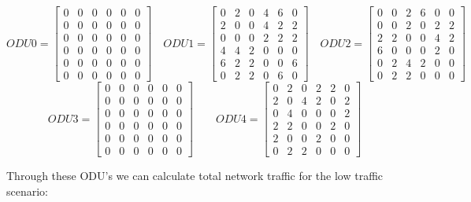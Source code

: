 \[
ODU0=
  \begin{bmatrix}
    0 & 0 & 0 & 0 & 0 & 0 \\
    0 & 0 & 0 & 0 & 0 & 0 \\
    0 & 0 & 0 & 0 & 0 & 0 \\
    0 & 0 & 0 & 0 & 0 & 0 \\
    0 & 0 & 0 & 0 & 0 & 0 \\
    0 & 0 & 0 & 0 & 0 & 0
  \end{bmatrix}
\quad ODU1=
  \begin{bmatrix}
    0 & 2 & 0 & 4 & 6 & 0 \\
    2 & 0 & 0 & 4 & 2 & 2 \\
    0 & 0 & 0 & 2 & 2 & 2 \\
    4 & 4 & 2 & 0 & 0 & 0 \\
    6 & 2 & 2 & 0 & 0 & 6 \\
    0 & 2 & 2 & 0 & 6 & 0
  \end{bmatrix}
\quad ODU2=
  \begin{bmatrix}
    0 & 0 & 2 & 6 & 0 & 0 \\
    0 & 0 & 2 & 0 & 2 & 2 \\
    2 & 2 & 0 & 0 & 4 & 2 \\
    6 & 0 & 0 & 0 & 2 & 0 \\
    0 & 2 & 4 & 2 & 0 & 0 \\
    0 & 2 & 2 & 0 & 0 & 0
  \end{bmatrix}
\]
\[
ODU3=
  \begin{bmatrix}
    0 & 0 & 0 & 0 & 0 & 0 \\
    0 & 0 & 0 & 0 & 0 & 0 \\
    0 & 0 & 0 & 0 & 0 & 0 \\
    0 & 0 & 0 & 0 & 0 & 0 \\
    0 & 0 & 0 & 0 & 0 & 0 \\
    0 & 0 & 0 & 0 & 0 & 0
  \end{bmatrix}
\qquad ODU4=
  \begin{bmatrix}
    0 & 2 & 0 & 2 & 2 & 0 \\
    2 & 0 & 4 & 2 & 0 & 2 \\
    0 & 4 & 0 & 0 & 0 & 2 \\
    2 & 2 & 0 & 0 & 2 & 0 \\
    2 & 0 & 0 & 2 & 0 & 0 \\
    0 & 2 & 2 & 0 & 0 & 0
  \end{bmatrix}
\]

\newpage
Through these ODU's we can calculate total network traffic for the low traffic scenario:\\

